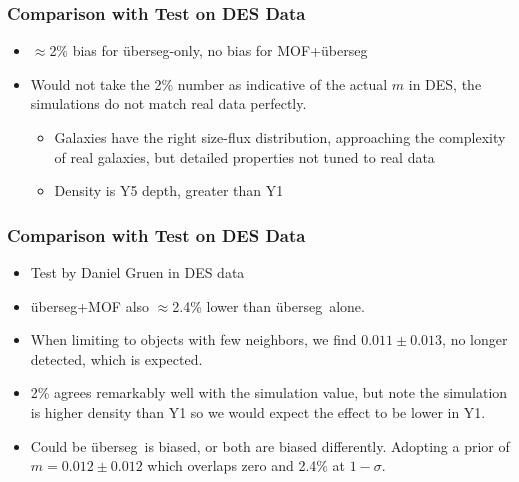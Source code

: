 \documentclass{beamer}
\newcommand{\uberseg}{{\"u}berseg}
\begin{document}
\frame
{

    \frametitle{Comparison with Test on DES Data}

    \begin{itemize}

        \item $\approx$2\% bias for \uberseg-only, no bias
            for MOF+\uberseg

        \item Would not take the 2\% number as indicative of the actual $m$ in
            DES, the simulations do not match real data perfectly.
            \begin{itemize}

                \item Galaxies have the right size-flux distribution,
                    approaching the complexity of real galaxies, but detailed
                    properties not tuned to real data

                \item Density is Y5 depth, greater than Y1

            \end{itemize}

    \end{itemize}
}
\frame
{

    \frametitle{Comparison with Test on DES Data}


    \begin{itemize}

        \item Test by Daniel Gruen in DES data

        \item \uberseg+MOF also $\approx$2.4\% lower than \uberseg\ alone.

        \item When limiting to objects with few neighbors, we find $0.011 \pm 0.013$,
            no longer detected, which is expected.

        \item 2\% agrees remarkably well with the simulation value, but note the
            simulation is higher density than Y1 so we would expect the effect
            to be lower in Y1.

        \item Could be \uberseg\ is biased, or both are biased differently.  Adopting
            a prior of $m = 0.012 \pm 0.012$ which overlaps zero and 2.4\% at $1-\sigma$.


    \end{itemize}


}
\end{document}
